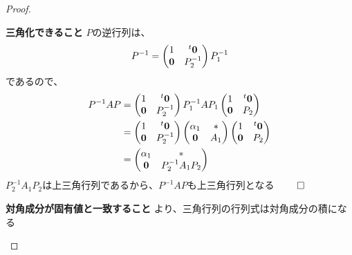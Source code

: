 \documentclass[../../../topic_linear-algebra]{subfiles}
\begin{document}
\begin{proof}
\begin{subpattern}{\bfseries 三角化できること}
    $P$の逆行列は、
    \begin{equation*}
      P^{-1} = \begin{pmatrix}
        1       & {}^t\vb*{0} \\
        \vb*{0} & P_2^{-1}
      \end{pmatrix} P_1^{-1}
    \end{equation*}
    であるので、
    \begin{align*}
      P^{-1}AP & = \begin{pmatrix}
                     1       & {}^t\vb*{0} \\
                     \vb*{0} & P_2^{-1}
                   \end{pmatrix} P_1^{-1} A P_1 \begin{pmatrix}
                                                  1       & {}^t\vb*{0} \\
                                                  \vb*{0} & P_2
                                                \end{pmatrix} \\
               & = \begin{pmatrix}
                     1       & {}^t\vb*{0} \\
                     \vb*{0} & P_2^{-1}
                   \end{pmatrix} \begin{pmatrix}
                                   \alpha_1 & *   \\
                                   \vb*{0}  & A_1
                                 \end{pmatrix}\begin{pmatrix}
                                                1       & {}^t\vb*{0} \\
                                                \vb*{0} & P_2
                                              \end{pmatrix}   \\
               & = \begin{pmatrix}
                     \alpha_1 & *              \\
                     \vb*{0}  & P_2^{-1}A_1P_2
                   \end{pmatrix}
    \end{align*}
    $P_2^{-1}A_1P_2$は上三角行列であるから、$P^{-1}AP$も上三角行列となる $\qed$
  \end{subpattern}

  \begin{subpattern}{\bfseries 対角成分が固有値と一致すること}
    より、三角行列の行列式は対角成分の積になる


\end{subpattern}
\end{proof}
\end{document}
